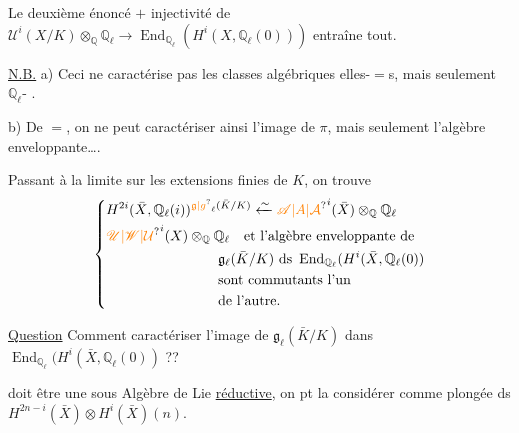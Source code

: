 Le deuxième énoncé $+$ injectivité de $\mathscr U^i(X/K)\otimes_{\mathbb Q}\mathbb Q_\ell \longrightarrow\operatorname{End}_{\mathbb Q_\ell}(H^i(X,\mathbb Q_\ell(0)))$ entraîne tout.

\uline{N.B.} a) Ceci ne caractérise pas les classes algébriques elles-$=$s, mais seulement  $\mathbb Q_\ell$- .

b) De $=$, on ne peut caractériser ainsi l'image de $\pi$, mais seulement l'algèbre enveloppante\ldots.

Passant à la limite sur les extensions finies de $K$, on trouve
\[
\left\{\begin{aligned}
&H^{2i}(\bar X,\mathbb Q_\ell(i))^{\unsure{\mathfrak g|g}_\ell(\bar K/K)}
\xleftarrow{\sim}\unsure{\mathscr A|A|\mathcal A}^{i}(\bar X)\otimes_{\mathbb Q}\mathbb Q_\ell\\
&\unsure{\mathscr U|\mathscr W|\mathcal U}^i(X)\otimes_{\mathbb Q}\mathbb Q_\ell\quad\text{et l'algèbre enveloppante de}\\
&\hspace{8em}\mathfrak g_\ell(\bar K/K)\ \text{ds }\operatorname{End}_{\mathbb Q_\ell}(H^i(\bar X,\mathbb Q_\ell(0))\\
&\hspace{8em}\text{sont commutants l'un}\\
&\hspace{8em}\text{de l'autre.}
\end{aligned}\right.
\]

\uline{Question} Comment caractériser l'image de $\mathfrak g_\ell(\bar K/K)$ dans $\operatorname{End}_{\mathbb Q_\ell}(H^i(\bar X,\mathbb Q_\ell(0))$ ??

 doit être une sous Algèbre de Lie \uline{réductive}, on pt la considérer comme plongée ds $H^{2n-i}(\bar X)\otimes H^i(\bar X)(n)$.

